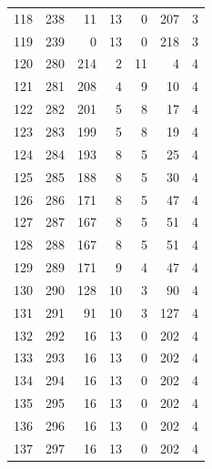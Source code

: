 \documentclass[a4paper,twoside,12pt]{book}
\begin{document}
\begin{appendices}
\begin{table}
\begin{tabular}{lrrrrrr}
		118 &    238 &        11 &        13 &               0 &             207 &         3 \\
		119 &    239 &         0 &        13 &               0 &             218 &         3 \\
		120 &    280 &       214 &         2 &              11 &               4 &         4 \\
		121 &    281 &       208 &         4 &               9 &              10 &         4 \\
		122 &    282 &       201 &         5 &               8 &              17 &         4 \\
		123 &    283 &       199 &         5 &               8 &              19 &         4 \\
		124 &    284 &       193 &         8 &               5 &              25 &         4 \\
		125 &    285 &       188 &         8 &               5 &              30 &         4 \\
		126 &    286 &       171 &         8 &               5 &              47 &         4 \\
		127 &    287 &       167 &         8 &               5 &              51 &         4 \\
		128 &    288 &       167 &         8 &               5 &              51 &         4 \\
		129 &    289 &       171 &         9 &               4 &              47 &         4 \\
		130 &    290 &       128 &        10 &               3 &              90 &         4 \\
		131 &    291 &        91 &        10 &               3 &             127 &         4 \\
		132 &    292 &        16 &        13 &               0 &             202 &         4 \\
		133 &    293 &        16 &        13 &               0 &             202 &         4 \\
		134 &    294 &        16 &        13 &               0 &             202 &         4 \\
		135 &    295 &        16 &        13 &               0 &             202 &         4 \\
		136 &    296 &        16 &        13 &               0 &             202 &         4 \\
		137 &    297 &        16 &        13 &               0 &             202 &         4 \\

\end{tabular}
\end{table}
\end{appendices}
\end{document}
